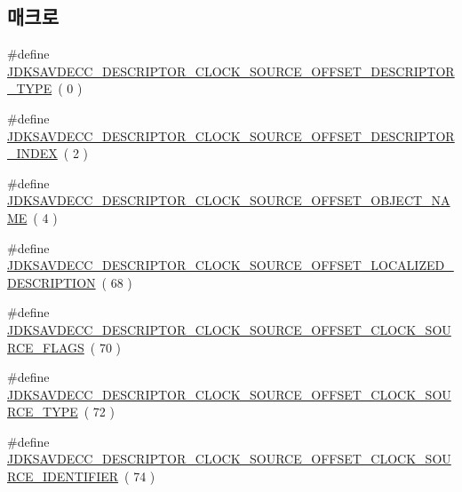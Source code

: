 \subsection*{매크로}
\begin{DoxyCompactItemize}
\item 
\#define \hyperlink{group__descriptor__clock__source_ga6e446694dcb0a801f8275594b58e8475}{J\+D\+K\+S\+A\+V\+D\+E\+C\+C\+\_\+\+D\+E\+S\+C\+R\+I\+P\+T\+O\+R\+\_\+\+C\+L\+O\+C\+K\+\_\+\+S\+O\+U\+R\+C\+E\+\_\+\+O\+F\+F\+S\+E\+T\+\_\+\+D\+E\+S\+C\+R\+I\+P\+T\+O\+R\+\_\+\+T\+Y\+PE}~( 0 )
\item 
\#define \hyperlink{group__descriptor__clock__source_ga1a9221832a4c4ca4341869d578e59a12}{J\+D\+K\+S\+A\+V\+D\+E\+C\+C\+\_\+\+D\+E\+S\+C\+R\+I\+P\+T\+O\+R\+\_\+\+C\+L\+O\+C\+K\+\_\+\+S\+O\+U\+R\+C\+E\+\_\+\+O\+F\+F\+S\+E\+T\+\_\+\+D\+E\+S\+C\+R\+I\+P\+T\+O\+R\+\_\+\+I\+N\+D\+EX}~( 2 )
\item 
\#define \hyperlink{group__descriptor__clock__source_ga39f401098b11f46bdf2a1dfa4ab86875}{J\+D\+K\+S\+A\+V\+D\+E\+C\+C\+\_\+\+D\+E\+S\+C\+R\+I\+P\+T\+O\+R\+\_\+\+C\+L\+O\+C\+K\+\_\+\+S\+O\+U\+R\+C\+E\+\_\+\+O\+F\+F\+S\+E\+T\+\_\+\+O\+B\+J\+E\+C\+T\+\_\+\+N\+A\+ME}~( 4 )
\item 
\#define \hyperlink{group__descriptor__clock__source_ga8d673400602aa68e4b7fbdbb7bc7dc67}{J\+D\+K\+S\+A\+V\+D\+E\+C\+C\+\_\+\+D\+E\+S\+C\+R\+I\+P\+T\+O\+R\+\_\+\+C\+L\+O\+C\+K\+\_\+\+S\+O\+U\+R\+C\+E\+\_\+\+O\+F\+F\+S\+E\+T\+\_\+\+L\+O\+C\+A\+L\+I\+Z\+E\+D\+\_\+\+D\+E\+S\+C\+R\+I\+P\+T\+I\+ON}~( 68 )
\item 
\#define \hyperlink{group__descriptor__clock__source_gaf84868c1aaeff0338fd8e36baf02855b}{J\+D\+K\+S\+A\+V\+D\+E\+C\+C\+\_\+\+D\+E\+S\+C\+R\+I\+P\+T\+O\+R\+\_\+\+C\+L\+O\+C\+K\+\_\+\+S\+O\+U\+R\+C\+E\+\_\+\+O\+F\+F\+S\+E\+T\+\_\+\+C\+L\+O\+C\+K\+\_\+\+S\+O\+U\+R\+C\+E\+\_\+\+F\+L\+A\+GS}~( 70 )
\item 
\#define \hyperlink{group__descriptor__clock__source_ga00cacf005f939ed249c468e874b51cbe}{J\+D\+K\+S\+A\+V\+D\+E\+C\+C\+\_\+\+D\+E\+S\+C\+R\+I\+P\+T\+O\+R\+\_\+\+C\+L\+O\+C\+K\+\_\+\+S\+O\+U\+R\+C\+E\+\_\+\+O\+F\+F\+S\+E\+T\+\_\+\+C\+L\+O\+C\+K\+\_\+\+S\+O\+U\+R\+C\+E\+\_\+\+T\+Y\+PE}~( 72 )
\item 
\#define \hyperlink{group__descriptor__clock__source_gacd8bf94039694e94a135942da80852b7}{J\+D\+K\+S\+A\+V\+D\+E\+C\+C\+\_\+\+D\+E\+S\+C\+R\+I\+P\+T\+O\+R\+\_\+\+C\+L\+O\+C\+K\+\_\+\+S\+O\+U\+R\+C\+E\+\_\+\+O\+F\+F\+S\+E\+T\+\_\+\+C\+L\+O\+C\+K\+\_\+\+S\+O\+U\+R\+C\+E\+\_\+\+I\+D\+E\+N\+T\+I\+F\+I\+ER}~( 74 )

\end{DoxyCompactItemize}
